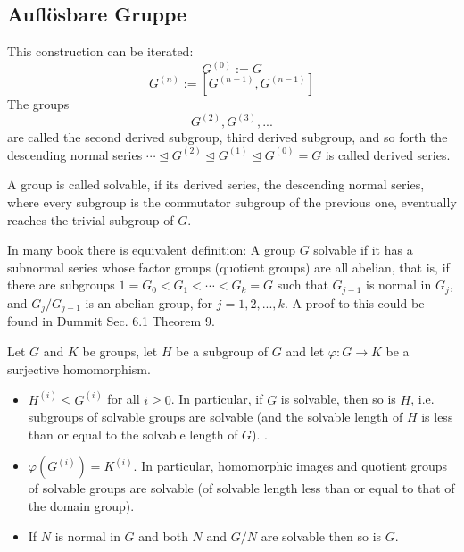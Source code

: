 \subsection{Aufl\"osbare Gruppe}
\begin{definition}
    This construction can be iterated:
    \[G^{(0)}:=G\]
    \[G^{(n)}:=[G^{(n-1)},G^{(n-1)}]\] 
    The groups \[G^{(2)},G^{(3)},...\] are called the second derived subgroup, third derived subgroup, and so forth the descending normal series \(\cdots\unlhd G^{(2)}\unlhd G^{(1)}\unlhd G^{(0)} = G\) is called derived series.
\end{definition}

\begin{definition}
    A group is called solvable, if its derived series, the descending normal series, where every subgroup is the commutator subgroup of the previous one, eventually reaches the trivial subgroup of \(G\).
\end{definition}
\begin{remark}
    In many book there is equivalent definition: A group \(G\)  solvable if it has a subnormal series whose factor groups (quotient groups) are all abelian, that is, if there are subgroups $1 = G_0 < G_1 < \cdots < G_k = G$ such that $G_{j-1}$ is normal in $G_j$, and $G_j/G_{j-1}$ is an abelian group, for $j = 1, 2, ..., k$. A proof to this could be found in Dummit Sec. 6.1 Theorem 9.
\end{remark}

\begin{proposition}\label{sol}
    Let \(G\) and \(K\) be groups, let \(H\) be a subgroup of \(G\) and let \(\varphi: G\to K\) be a surjective homomorphism.\begin{itemize}
        \item \(H^{(i)}\leq G^{(i)}\) for all \(i\geq 0\). In particular, if \(G\) is solvable, then so is \(H\), i.e. subgroups of solvable groups are solvable (and the solvable length of $H$ is less than or equal to the solvable length of $G$). .
        \item \(\varphi(G^{(i)}) = K^{(i)}\). In particular, homomorphic images and quotient groups of 
        solvable groups are solvable (of solvable length less than or equal to that of the 
        domain group).
        \item If \(N\) is normal in \(G\) and both \(N\) and \(G/N\) are solvable then so is \(G\).    
    \end{itemize}
\end{proposition}

